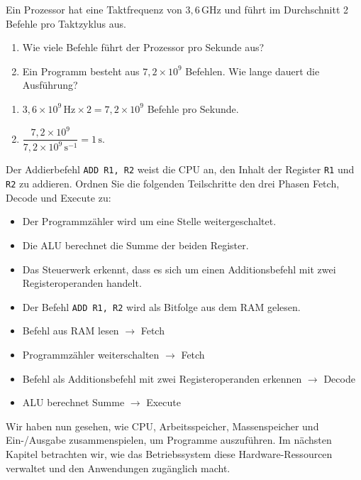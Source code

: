 \begin{myexercise}
    Ein Prozessor hat eine Taktfrequenz von $3{,}6\,\mathrm{GHz}$ und führt im Durchschnitt 2 Befehle pro Taktzyklus aus.
    \begin{enumerate}
        \item Wie viele Befehle führt der Prozessor pro Sekunde aus?
        \item Ein Programm besteht aus $7{,}2 \times 10^9$ Befehlen. Wie lange dauert die Ausführung?
    \end{enumerate}
    \begin{myanswer}
        \begin{enumerate}
            \item $3{,}6 \times 10^9 \,\mathrm{Hz} \times 2 = 7{,}2 \times 10^9$ Befehle pro Sekunde.
            \item $\dfrac{7{,}2 \times 10^9}{7{,}2 \times 10^9\,\mathrm{s}^{-1}} = 1\,\mathrm{s}$.
        \end{enumerate}
    \end{myanswer}
\end{myexercise}

\begin{mychallenge}
    Der Addierbefehl \texttt{ADD R1, R2} weist die CPU an, den Inhalt der Register \texttt{R1} und \texttt{R2} zu addieren. Ordnen Sie die folgenden Teilschritte den drei Phasen Fetch, Decode und Execute zu:
    \begin{itemize}
        \item Der Programmzähler wird um eine Stelle weitergeschaltet.
        \item Die ALU berechnet die Summe der beiden Register.
        \item Das Steuerwerk erkennt, dass es sich um einen Additionsbefehl mit zwei Registeroperanden handelt.
        \item Der Befehl \texttt{ADD R1, R2} wird als Bitfolge aus dem RAM gelesen.
    \end{itemize}
    \begin{myanswer}
        \begin{itemize}
            \item Befehl aus RAM lesen $\to$ Fetch
            \item Programmzähler weiterschalten $\to$ Fetch
            \item Befehl als Additionsbefehl mit zwei Registeroperanden erkennen $\to$ Decode
            \item ALU berechnet Summe $\to$ Execute
        \end{itemize}
    \end{myanswer}
\end{mychallenge}

Wir haben nun gesehen, wie CPU, Arbeitsspeicher, Massenspeicher und Ein-/Ausgabe zusammenspielen, um Programme auszuführen. Im nächsten Kapitel betrachten wir, wie das Betriebssystem diese Hardware-Ressourcen verwaltet und den Anwendungen zugänglich macht.
